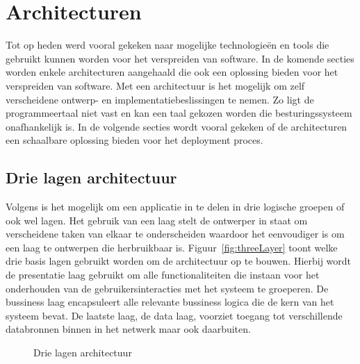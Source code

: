 \section{Architecturen}
Tot op heden werd vooral gekeken naar mogelijke technologieën en tools die gebruikt kunnen worden voor het verspreiden van software.
In de komende secties worden enkele architecturen aangehaald die ook een oplossing bieden voor het verspreiden van software.
Met een architectuur is het mogelijk om zelf verscheidene ontwerp- en implementatiebeslissingen te nemen.
Zo ligt de programmeertaal niet vast en kan een taal gekozen worden die besturingssysteem onafhankelijk is.
In de volgende secties wordt vooral gekeken of de architecturen een schaalbare oplossing bieden voor het deployment proces.

\subsection{Drie lagen architectuur}
Volgens \citet{micro} is het mogelijk om een applicatie in te delen in drie logische groepen of ook wel lagen.
Het gebruik van een laag stelt de ontwerper in staat om verscheidene taken van elkaar te onderscheiden waardoor het eenvoudiger is om een laag te ontwerpen die herbruikbaar is.
Figuur~\vref{fig:threeLayer} toont welke drie basis lagen gebruikt worden om de architectuur op te bouwen.
Hierbij wordt de presentatie laag gebruikt om alle functionaliteiten die instaan voor het onderhouden van de gebruikersinteracties met het systeem te groeperen.
De bussiness laag encapsuleert alle relevante bussiness logica die de kern van het systeem bevat.
De laatste laag, de data laag, voorziet toegang tot verschillende databronnen binnen in het netwerk maar ook daarbuiten.
 
\begin{figure}[!ht]
\centering
{}
\caption{Drie lagen architectuur \citep{micro}}
\label{fig:threeLayer}
\end{figure}

